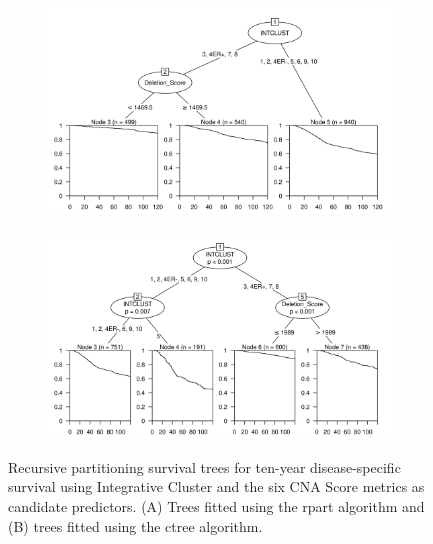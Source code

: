 \begin{figure}[!h]
\centering

\vspace{0.5cm}

\begin{subfigure}{\textwidth}
\subcaption{}
\includegraphics[width=1\textwidth]{../figures/Chapter_3/PartyKit_Survival_Score_TenYearDSS_INTCLUST.png}
\end{subfigure}

\vspace{2cm}

\begin{subfigure}{\textwidth}
\subcaption{}
\includegraphics[width=1\textwidth]{../figures/Chapter_3/Ctree_Survival_Score_TenYearDSS_INTCLUST.png}
\end{subfigure}

\vspace{0.5cm}

\caption[Recursive partitioning survival trees for ten-year disease-specific survival using Integrative Cluster and the six CNA Score metrics as candidate predictors.]{Recursive partitioning survival trees for ten-year disease-specific survival using Integrative Cluster and the six CNA Score metrics as candidate predictors. (A) Trees fitted using the rpart algorithm and (B) trees fitted using the ctree algorithm.}
\label{fig:INTCLUST_CNA_Score_TenYearDSS}
\end{figure}

